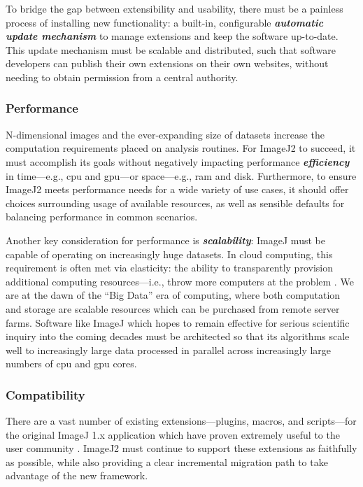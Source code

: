 \documentclass{bmcart}
\begin{document}
To bridge the gap between extensibility and usability, there must be a painless
process of installing new functionality: a built-in, configurable
\textbf{\textit{automatic update mechanism}} to manage extensions and keep the
software up-to-date. This update mechanism must be scalable and distributed,
such that software developers can publish their own extensions on their own
websites, without needing to obtain permission from a central authority.

\subsubsection*{Performance}
N-dimensional images and the ever-expanding size of datasets increase the
computation requirements placed on analysis routines. For ImageJ2 to succeed,
it must accomplish its goals without negatively impacting performance
\textbf{\textit{efficiency}} in time---e.g., \acrfull{cpu} and
\acrfull{gpu}---or space---e.g., \acrfull{ram} and disk. Furthermore, to ensure
ImageJ2 meets performance needs for a wide variety of use cases, it should
offer choices surrounding usage of available resources, as well as sensible
defaults for balancing performance in common scenarios.

Another key consideration for performance is \textbf{\textit{scalability}}:
ImageJ must be capable of operating on increasingly huge datasets. In cloud
computing, this requirement is often met via elasticity: the ability to
transparently provision additional computing resources---i.e., throw more
computers at the problem \cite{hardware_is_cheap}. We are at the dawn of the
``Big Data'' era of computing, where both computation and storage are scalable
resources which can be purchased from remote server farms. Software like ImageJ
which hopes to remain effective for serious scientific inquiry into the coming
decades must be architected so that its algorithms scale well to increasingly
large data processed in parallel across increasingly large numbers of
\acrshort{cpu} and \acrshort{gpu} cores.

\subsubsection*{Compatibility}
There are a vast number of existing extensions---plugins, macros, and
scripts---for the original ImageJ 1.x application which have proven extremely
useful to the user community \cite{imagej_ecosystem}. ImageJ2 must continue to
support these extensions as faithfully as possible, while also providing a
clear incremental migration path to take advantage of the new framework.
\end{document}
